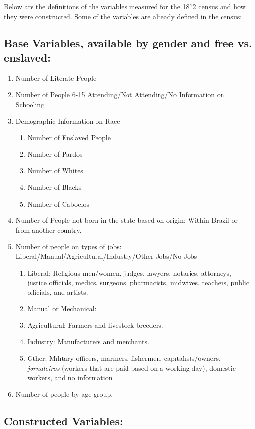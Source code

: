 \documentclass{article}
\begin{document}
Below are the definitions of the variables measured for the 1872 census and how they were constructed. Some of the variables are already defined in the census:

\subsection{Base Variables, available by gender and free vs. enslaved:}

\begin{enumerate}
  \item Number of Literate People
  \item Number of People 6-15 Attending/Not Attending/No Information on Schooling
  \item Demographic Information on Race
    \begin{enumerate}
      \item Number of Enslaved People
      \item Number of Pardos
      \item Number of Whites
      \item Number of Blacks
      \item Number of Caboclos
    \end{enumerate}
  \item Number of People not born in the state based on origin: Within Brazil or from another country.
  \item Number of people on types of jobs: Liberal/Manual/Agricultural/Industry/Other Jobs/No Jobs
    \begin{enumerate}
      \item Liberal: Religious men/women, judges, lawyers, notaries, attorneys, justice officials, medics, surgeons, pharmacists, midwives, teachers, public officials, and artists.
      \item Manual or Mechanical: 
      \item Agricultural: Farmers and livestock breeders.
      \item Industry: Manufacturers and merchants.
      \item Other: Military officers, mariners, fishermen, capitalists/owners, \textit{jornaleiros} (workers that are paid based on a working day), domestic workers, and no information
    \end{enumerate}
  \item Number of people by age group.
\end{enumerate}

\subsection{Constructed Variables:}
\end{document}
